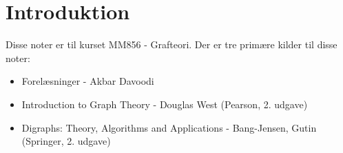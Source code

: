 \chapter{Introduktion}

Disse noter er til kurset MM856 - Grafteori. Der er tre primære kilder til disse noter:
\begin{itemize}
	\item Forelæsninger - Akbar Davoodi
	\item Introduction to Graph Theory - Douglas West (Pearson, 2. udgave)
	\item Digraphs: Theory, Algorithms and Applications - Bang-Jensen, Gutin (Springer, 2. udgave)
\end{itemize}
